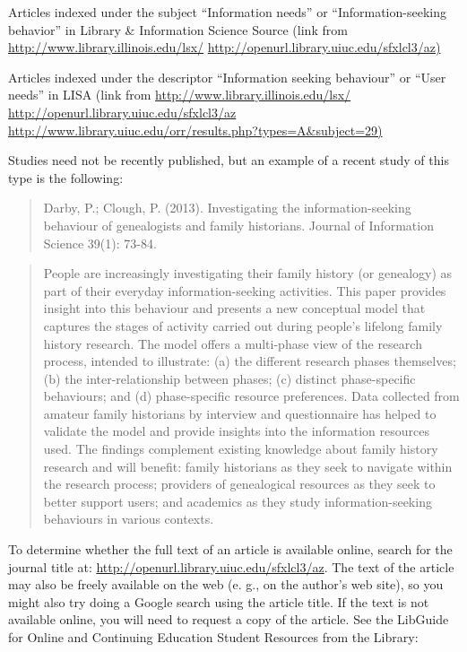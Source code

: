 \documentclass[]{article}
\begin{document}
Articles indexed under the subject ``Information needs'' or
``Information-seeking behavior'' in Library \& Information Science
Source (link from \url{http://www.library.illinois.edu/lsx/}
\url{http://openurl.library.uiuc.edu/sfxlcl3/az)}

Articles indexed under the descriptor ``Information seeking behaviour''
or ``User needs'' in LISA (link from
\url{http://www.library.illinois.edu/lsx/}
\url{http://openurl.library.uiuc.edu/sfxlcl3/az}
\url{http://www.library.uiuc.edu/orr/results.php?types=A\&subject=29)}

Studies need not be recently published, but an example of a recent study
of this type is the following:

\begin{quote}
Darby, P.; Clough, P. (2013). Investigating the information-seeking
behaviour of genealogists and family historians. Journal of Information
Science 39(1): 73-84.
\end{quote}

\begin{quote}
People are increasingly investigating their family history (or
genealogy) as part of their everyday information-seeking activities.
This paper provides insight into this behaviour and presents a new
conceptual model that captures the stages of activity carried out during
people's lifelong family history research. The model offers a
multi-phase view of the research process, intended to illustrate: (a)
the different research phases themselves; (b) the inter-relationship
between phases; (c) distinct phase-specific behaviours; and (d)
phase-specific resource preferences. Data collected from amateur family
historians by interview and questionnaire has helped to validate the
model and provide insights into the information resources used. The
findings complement existing knowledge about family history research and
will benefit: family historians as they seek to navigate within the
research process; providers of genealogical resources as they seek to
better support users; and academics as they study information-seeking
behaviours in various contexts.
\end{quote}

To determine whether the full text of an article is available online,
search for the journal title at:
\url{http://openurl.library.uiuc.edu/sfxlcl3/az}. The text of the
article may also be freely available on the web (e. g., on the author's
web site), so you might also try doing a Google search using the article
title. If the text is not available online, you will need to request a
copy of the article. See the LibGuide for Online and Continuing
Education Student Resources from the Library:
\end{document}
